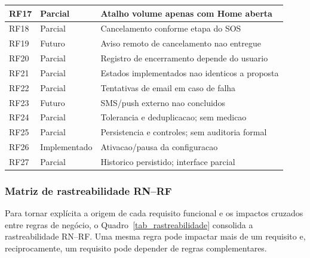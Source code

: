 \begin{longtable}{p{1.25cm}p{2.2cm}p{10.0cm}}
\hline
RF17 & Parcial & Atalho volume apenas com Home aberta \\
\hline
RF18 & Parcial & Cancelamento conforme etapa do SOS \\
\hline
RF19 & Futuro & Aviso remoto de cancelamento nao entregue \\
\hline
RF20 & Parcial & Registro de encerramento depende do usuario \\
\hline
RF21 & Parcial & Estados implementados nao identicos a proposta \\
\hline
RF22 & Parcial & Tentativas de email em caso de falha \\
\hline
RF23 & Futuro & SMS/push externo nao concluidos \\
\hline
RF24 & Parcial & Tolerancia e deduplicacao; sem medicao \\
\hline
RF25 & Parcial & Persistencia e controles; sem auditoria formal \\
\hline
RF26 & Implementado & Ativacao/pausa da configuracao \\
\hline
RF27 & Parcial & Historico persistido; interface parcial \\
\hline
\end{longtable}

\subsubsection{Matriz de rastreabilidade RN--RF}

Para tornar explícita a origem de cada requisito funcional e os impactos cruzados entre regras de negócio, o Quadro~\ref{tab_rastreabilidade} consolida a rastreabilidade RN--RF. Uma mesma regra pode impactar mais de um requisito e, reciprocamente, um requisito pode depender de regras complementares.

